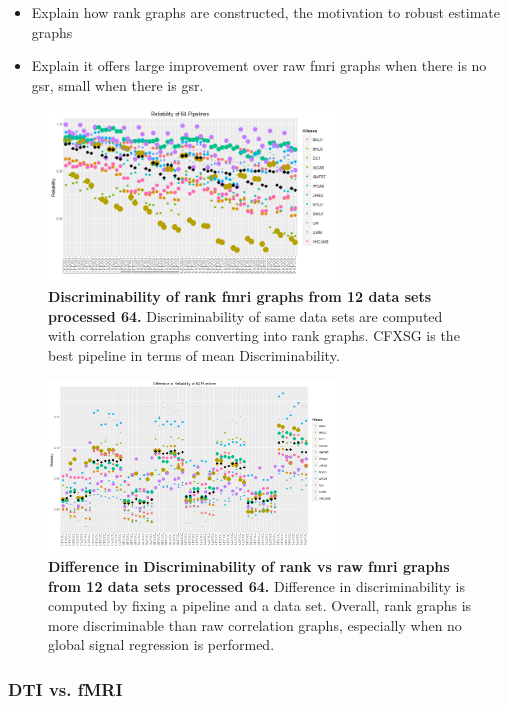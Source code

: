 \documentclass{article}
\begin{document}
\begin{itemize}
	\item Explain how rank graphs are constructed, the motivation to robust estimate graphs
	\item Explain it offers large improvement over raw fmri graphs when there is no gsr, small when there is gsr.
\end{itemize}
\begin{figure}[t!]
	\includegraphics[width=3.0in]{../Figs/64_pipelines_size_rank.png}
	\caption{{\bf Discriminability of rank fmri graphs from 12 data sets processed 64.} Discriminability of same data sets are computed with correlation graphs converting into rank graphs. CFXSG is the best pipeline in terms of mean Discriminability.}
	\label{fig:8}
\end{figure}


\begin{figure}[t!]
	\includegraphics[width=3.0in]{../Figs/64_pipelines_differ.png}
	\caption{{\bf Difference in Discriminability of rank vs raw fmri graphs from 12 data sets processed 64.} Difference in discriminability is computed by fixing a pipeline and a data set. Overall, rank graphs is more discriminable than raw correlation graphs, especially when no global signal regression is performed. }
	\label{fig:9}
\end{figure}




\subsubsection{DTI vs. fMRI}
\end{document}

